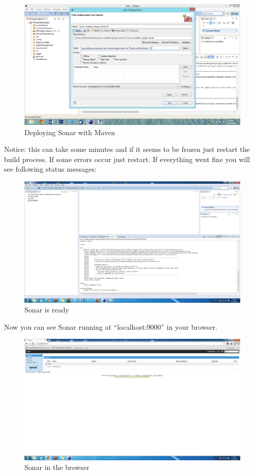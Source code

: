 \begin{figure}
	\centering
		\includegraphics[width=\textwidth]{sonardeploy}
	\caption{Deploying Sonar with Maven}
	\label{fig:sonardeploy}
\end{figure}
 
Notice: this can take some minutes and if it seems to be frozen just restart the build process. If some errors occur just restart.
If everything went fine you will see following status messages:
 
\begin{figure}
	\centering
		\includegraphics[width=\textwidth]{sonarready}
	\caption{Sonar is ready}
	\label{fig:sonarready}
\end{figure}

Now you can see Sonar running at "`localhost:9000"'  in your browser.

\begin{figure}
	\centering
		\includegraphics[width=\textwidth]{sonarrunning}
	\caption{Sonar in the browser}
	\label{fig:sonarrunning}
\end{figure}



